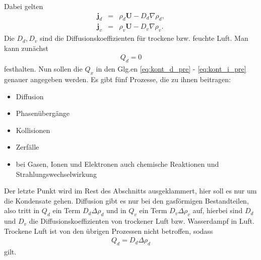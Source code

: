 \documentclass{book}
\begin{document}
%
Dabei gelten
%
\begin{eqnarray}
\mathbf{j}_d & = & \rho_d\mathbf{U} - D_d\nabla\rho_d,\\
\mathbf{j}_v & = & \rho_v\mathbf{U} - D_v\nabla\rho_v.
\end{eqnarray}
%
Die $D_d, D_v$ sind die Diffusionskoeffizienten für trockene bzw. feuchte Luft. Man kann zunächst
%
\begin{eqnarray}
Q_d = 0
\end{eqnarray}
%
festhalten. Nun sollen die $Q_x$ in den Glg.en \eqref{eq:kont_d_pre} - \eqref{eq:kont_i_pre} genauer angegeben werden. Es gibt fünf Prozesse, die zu ihnen beitragen:
%
\begin{itemize}
\item Diffusion
\item Phasenübergänge
\item Kollisionen
\item Zerfälle
\item bei Gasen, Ionen und Elektronen auch chemische Reaktionen und Strahlungswechselwirkung
\end{itemize}
%
Der letzte Punkt wird im Rest des Abschnitts ausgeklammert, hier soll es nur um die Kondensate gehen. Diffusion gibt es nur bei den gasförmigen Bestandteilen, also tritt in $Q_d$ ein Term $D_d\Delta\rho_d$ und in $Q_v$ ein Term $D_v\Delta\rho_v$ auf, hierbei sind $D_d$ und $D_v$ die Diffusionskoeffizienten von trockener Luft bzw. Wasserdampf in Luft. Trockene Luft ist von den übrigen Prozessen nicht betroffen, sodass
%
\begin{eqnarray}
Q_d = D_d\Delta\rho_d
\end{eqnarray}
%
gilt.
\end{document}
